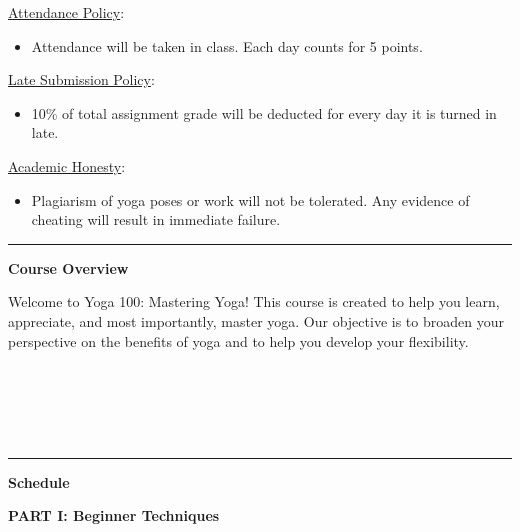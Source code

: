 \documentclass{article}
\begin{document}
\begin{flushleft}
\vspace{0.1cm}

\underline{Attendance Policy}: 

\vspace{0.1cm}
\begin{itemize}[noitemsep,nolistsep]
    \item Attendance will be taken in class. Each day counts for 5 points.
\end{itemize}

\vspace{0.1cm}

\underline{Late Submission Policy}:
\begin{itemize}[noitemsep,nolistsep]
    \item 10\% of total assignment grade will be deducted for every day it is turned in late.
\end{itemize}

\vspace{0.1cm}

\underline{Academic Honesty}:

\vspace{0.1cm}
\begin{itemize}[noitemsep,nolistsep]
    \item Plagiarism of yoga poses or work will not be tolerated. Any evidence of cheating will result in immediate failure.
\end{itemize}


\noindent\rule[0.5ex]{\linewidth}{1pt}


\Large
\vspace{0.5cm}
\textbf{Course Overview}
\vspace{0.5cm}
\large

Welcome to Yoga 100: Mastering Yoga! This course is created to help you learn, appreciate, and most importantly, master yoga. Our objective is to broaden your perspective on the benefits of yoga and to help you develop your flexibility.

\end{flushleft}

\\\\\\\\
\noindent\rule[0.5ex]{\linewidth}{1pt}
\begin{flushleft}
\Large
\textbf{Schedule}
\end{flushleft}

\large
\begin{center}
\textbf{PART I: Beginner Techniques}
\end{center}
\end{document}
